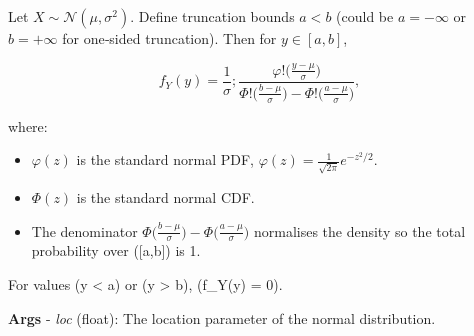 \documentclass[
  letterpaper,
  DIV=11,
  numbers=noendperiod]{scrartcl}
\providecommand{\tightlist}{%
  \setlength{\itemsep}{0pt}\setlength{\parskip}{0pt}}\usepackage{longtable,booktabs,array}
\begin{document}
Let \(X \sim \mathcal N(\mu, \sigma^2)\). Define truncation bounds
\(a < b\) (could be \(a = -\infty\) or \(b = +\infty\) for one‐sided
truncation). Then for \(y \in [a,b]\),

\[
f_Y(y) = \frac{1}{\sigma} ; \frac{\varphi!\bigl(\frac{y - \mu}{\sigma}\bigr)}{\Phi!\bigl(\frac{b - \mu}{\sigma}\bigr) - \Phi!\bigl(\frac{a - \mu}{\sigma}\bigr)} ,
\]

where:

\begin{itemize}
\tightlist
\item
  \(\varphi(z)\) is the standard normal PDF,
  \(\varphi(z) = \frac1{\sqrt{2\pi}} e^{-z^2/2}\).
\item
  \(\Phi(z)\) is the standard normal CDF.
\item
  The denominator
  \(\Phi\bigl(\tfrac{b - \mu}{\sigma}\bigr) - \Phi\bigl(\tfrac{a - \mu}{\sigma}\bigr)\)
  normalises the density so the total probability over ({[}a,b{]}) is 1.
\end{itemize}

For values (y \textless{} a) or (y \textgreater{} b), (f\_Y(y) = 0).

\textbf{Args} - \emph{loc} (float): The location parameter of the normal
distribution.
\end{document}

